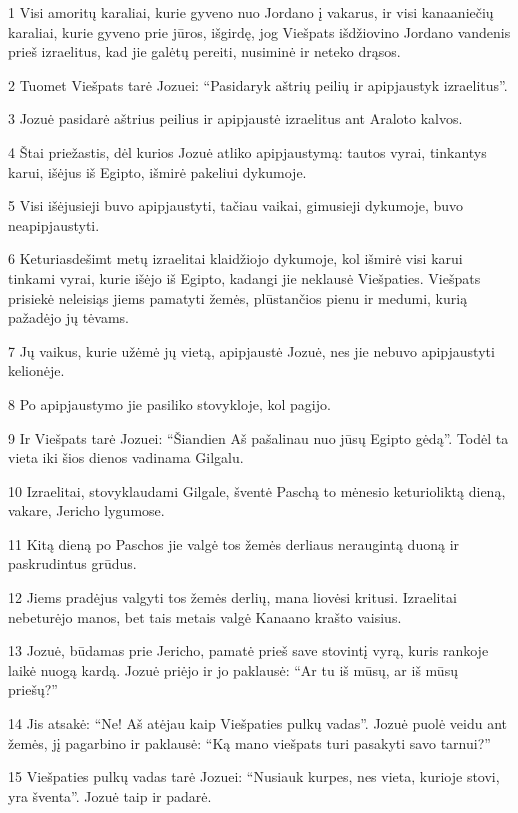 \par 1 Visi amoritų karaliai, kurie gyveno nuo Jordano į vakarus, ir visi kanaaniečių karaliai, kurie gyveno prie jūros, išgirdę, jog Viešpats išdžiovino Jordano vandenis prieš izraelitus, kad jie galėtų pereiti, nusiminė ir neteko drąsos. 
\par 2 Tuomet Viešpats tarė Jozuei: “Pasidaryk aštrių peilių ir apipjaustyk izraelitus”. 
\par 3 Jozuė pasidarė aštrius peilius ir apipjaustė izraelitus ant Araloto kalvos. 
\par 4 Štai priežastis, dėl kurios Jozuė atliko apipjaustymą: tautos vyrai, tinkantys karui, išėjus iš Egipto, išmirė pakeliui dykumoje. 
\par 5 Visi išėjusieji buvo apipjaustyti, tačiau vaikai, gimusieji dykumoje, buvo neapipjaustyti. 
\par 6 Keturiasdešimt metų izraelitai klaidžiojo dykumoje, kol išmirė visi karui tinkami vyrai, kurie išėjo iš Egipto, kadangi jie neklausė Viešpaties. Viešpats prisiekė neleisiąs jiems pamatyti žemės, plūstančios pienu ir medumi, kurią pažadėjo jų tėvams. 
\par 7 Jų vaikus, kurie užėmė jų vietą, apipjaustė Jozuė, nes jie nebuvo apipjaustyti kelionėje. 
\par 8 Po apipjaustymo jie pasiliko stovykloje, kol pagijo. 
\par 9 Ir Viešpats tarė Jozuei: “Šiandien Aš pašalinau nuo jūsų Egipto gėdą”. Todėl ta vieta iki šios dienos vadinama Gilgalu. 
\par 10 Izraelitai, stovyklaudami Gilgale, šventė Paschą to mėnesio keturioliktą dieną, vakare, Jericho lygumose. 
\par 11 Kitą dieną po Paschos jie valgė tos žemės derliaus neraugintą duoną ir paskrudintus grūdus. 
\par 12 Jiems pradėjus valgyti tos žemės derlių, mana liovėsi kritusi. Izraelitai nebeturėjo manos, bet tais metais valgė Kanaano krašto vaisius. 
\par 13 Jozuė, būdamas prie Jericho, pamatė prieš save stovintį vyrą, kuris rankoje laikė nuogą kardą. Jozuė priėjo ir jo paklausė: “Ar tu iš mūsų, ar iš mūsų priešų?” 
\par 14 Jis atsakė: “Ne! Aš atėjau kaip Viešpaties pulkų vadas”. Jozuė puolė veidu ant žemės, jį pagarbino ir paklausė: “Ką mano viešpats turi pasakyti savo tarnui?” 
\par 15 Viešpaties pulkų vadas tarė Jozuei: “Nusiauk kurpes, nes vieta, kurioje stovi, yra šventa”. Jozuė taip ir padarė.



